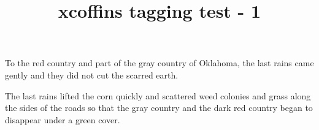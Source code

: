 \documentclass{article}
\title{xcoffins tagging test - 1}
\begin{document}
\SetHorizontalCoffin{}

To the red country and part of the gray country of Oklahoma, the last rains came gently and they did not cut the scarred earth.

The last rains lifted the corn quickly and scattered weed colonies and grass along the sides of the roads so that the gray country and the dark red country began to disappear under a green cover.  
\end{document}

